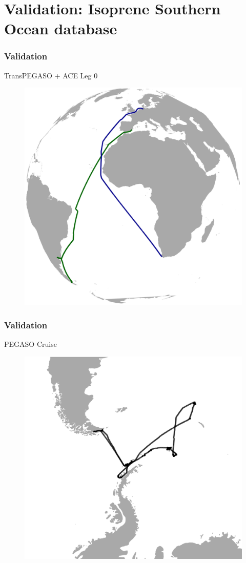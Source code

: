 \documentclass{beamer}
\begin{document}
\section{Validation: Isoprene Southern Ocean database}
\begin{frame}
\frametitle{Validation}
TransPEGASO + ACE Leg 0
\begin{figure}
\includegraphics[width=0.6\linewidth]{tpeg_ace4.png}
\end{figure}
\end{frame}

\begin{frame}
\frametitle{Validation}
PEGASO Cruise
\begin{figure}
\includegraphics[width=0.6\linewidth]{peg.png}
\end{figure}
\end{frame}
\end{document}
